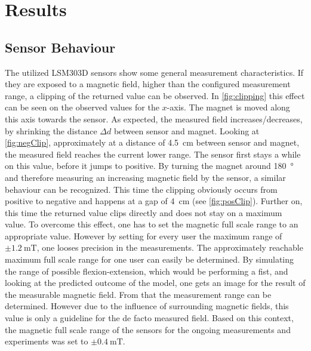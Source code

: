 \lhead[\chaptername~\thechapter]{\rightmark}

\rhead[\leftmark]{}

\lfoot[\thepage]{}

\cfoot{}

\rfoot[]{\thepage}

\chapter{Results} \label{cha:results}

\section{Sensor Behaviour} \label{sec:dataRes}

The utilized LSM303D sensors show some general measurement characteristics. If they are exposed to a magnetic field, higher than the configured measurement range, a clipping of the returned value can be observed. In \ref{fig:clipping} this effect can be seen on the observed values for the $ x $-axis. The magnet is moved along this axis towards the sensor. As expected, the measured field increases/decreases, by shrinking the distance $ \Delta d $ between sensor and magnet. Looking at \ref{fig:negClip}, approximately at a distance of \SI{4.5}{\cm} between sensor and magnet, the measured field reaches the current lower range. The sensor first stays a while on this value, before it jumps to positive. By turning the magnet around \SI{180}{\degree} and therefore measuring an increasing magnetic field by the sensor, a similar behaviour can be recognized. This time the clipping obviously occurs from positive to negative and happens at a gap of \SI{4}{\cm} (see \ref{fig:posClip}). Further on, this time the returned value clips directly and does not stay on a maximum value. To overcome this effect, one has to set the magnetic full scale range to an appropriate value. However by setting for every user the maximum range of $ \pm \SI{1.2}{\milli \tesla} $, one looses precision in the measurements. The approximately reachable maximum full scale range for one user can easily be determined. By simulating the range of possible flexion-extension, which would be performing a fist, and looking at the predicted outcome of the  model, one gets an image for the result of the measurable magnetic field. From that the measurement range can be determined. However due to the influence of surrounding magnetic fields, this value is only a guideline for the de facto measured field. Based on this context, the magnetic full scale range of the sensors for the ongoing measurements and experiments was set to $ \pm \SI{0.4}{\milli \tesla} $.

